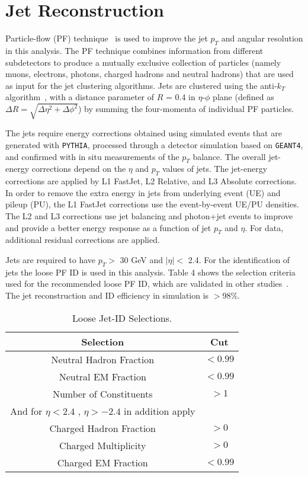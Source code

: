 \section{Jet Reconstruction}

Particle-flow (PF) technique~\cite{CMS-PAS-PFT-09-001,CMS-PAS-PFT-10-002} is used to improve the jet $p_T$ and angular resolution in this analysis.
The PF technique combines information from different subdetectors to produce a mutually exclusive collection of particles (namely muons, electrons, photons, 
charged hadrons and neutral hadrons) that are used as input for the jet clustering algorithms.
Jets are clustered using the anti-$k_{T}$ algorithm~\cite{anti-kT}, with a distance parameter of $R$ = 0.4 in $\eta$-$\phi$ plane (defined as $\Delta R = 
\sqrt{\Delta \eta^2 + \Delta \phi^2}$) by summing the four-momenta of individual PF particles.

The jets require energy corrections obtained using simulated events that are generated with \texttt{PYTHIA}, processed through a detector simulation based on 
\texttt{GEANT4}, and confirmed with in situ measurements of the $p_T$ balance.
The overall jet-energy corrections depend on the $\eta$ and $p_T$ values of jets.
The jet-energy corrections are applied by L1 FastJet, L2 Relative, and L3 Absolute corrections. In order to remove the extra energy in jets from underlying event 
(UE) and pileup (PU), the L1 FastJet corrections use the event-by-event UE/PU densities.
The L2 and L3 corrections use jet balancing and photon+jet events to improve and provide a better energy response as a function of jet $p_T$ and $\eta$.
For data, additional residual corrections are applied.

Jets are required to have $p_T >$ 30 GeV and $|\eta| <$ 2.4.
For the identification of jets the loose PF ID is used in this analysis.
Table 4 shows the selection criteria used for the recommended loose PF ID, which are validated in other studies~\cite{CMS-PAS-FSQ-12-035}.
The jet reconstruction and ID efficiency in simulation is $>$98\%.

\begin{table}[ht]
\begin{center}
 \caption{Loose Jet-ID Selections.\label{tab:jetId}}
 \begin{tabular}{|cc|}
 \hline\hline
       Selection                        & Cut        \\[0.5ex] \hline
       Neutral Hadron Fraction          & $<0.99$      \\
       Neutral EM Fraction              & $<0.99$      \\
       Number of Constituents           & $> 1$        \\
       And for $\eta < 2.4$ , $\eta > -2.4$ in addition apply &\\
       Charged Hadron Fraction 	        & $> 0$   \\
       Charged Multiplicity             & $> 0$   \\
       Charged EM Fraction              & $<0.99$ \\
 \hline
 \hline
 \end{tabular}
\end{center}
\end{table}

